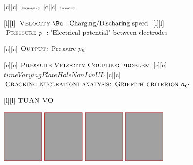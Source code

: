 [c][c] {$\textsc{\tiny Uncharging}$}
[c][c] {$\textsc{\tiny Charging}$}

[l][l] {$\textsc{Velocity } \Bu \, :\text{Charging/Discharing speed}$}
[l][l] {$\textsc{Pressure } p   \,\, :\text{"Electrical potential" between electrodes}$}

[c][c] {$\textsc{Output: } \text{Pressure } p_h$}

[c][c] {$\textsc{Pressure-Velocity Coupling problem}$}
[c][c] {$timeVaryingPlateHoleNonLinUL$}
[c][c] {$\textsc{Cracking nucleationi analysis: Griffith criterion } a_{G}$}

[l][l] {$\textsc{TUAN VO}$}

\includegraphics[width=0.65\textwidth]{comparison_ana_numa.eps}